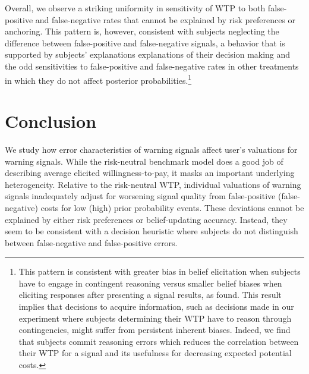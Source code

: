 \documentclass[12pt,a4paper]{article}
\begin{document}
Overall, we observe a striking uniformity in sensitivity of WTP to both false-positive and false-negative rates that cannot be explained by risk preferences or anchoring. This pattern is, however, consistent with subjects neglecting the difference between false-positive and false-negative signals, a behavior that is supported by subjects' explanations explanations of their decision making and the odd sensitivities to false-positive and false-negative rates in other treatments in which they do not affect posterior probabilities.\footnote{This pattern is consistent with greater bias in belief elicitation when subjects have to engage in contingent reasoning versus smaller belief biases when eliciting responses after presenting a signal results, as \citet{aina_contingent_2023} found. This result implies that decisions to acquire information, such as decisions made in our experiment where subjects determining their WTP have to reason through contingencies, might suffer from persistent inherent biases. Indeed, we find that subjects commit reasoning errors which reduces the correlation between their WTP for a signal and its usefulness for decreasing expected potential costs.} 

\vspace{10pt}
\section{Conclusion}\label{sec:conclusion}

We study how error characteristics of warning signals affect user's valuations for warning signals.  While the risk-neutral benchmark model does a good job of describing average elicited willingness-to-pay, it masks an important underlying heterogeneity.  Relative to the risk-neutral WTP, individual valuations of warning signals inadequately adjust for worsening signal quality from false-positive (false-negative) costs for low (high) prior probability events. These deviations cannot be explained by either risk preferences or belief-updating accuracy. Instead, they seem to be consistent with a decision heuristic where subjects do not distinguish between false-negative and false-positive errors.
\end{document}
